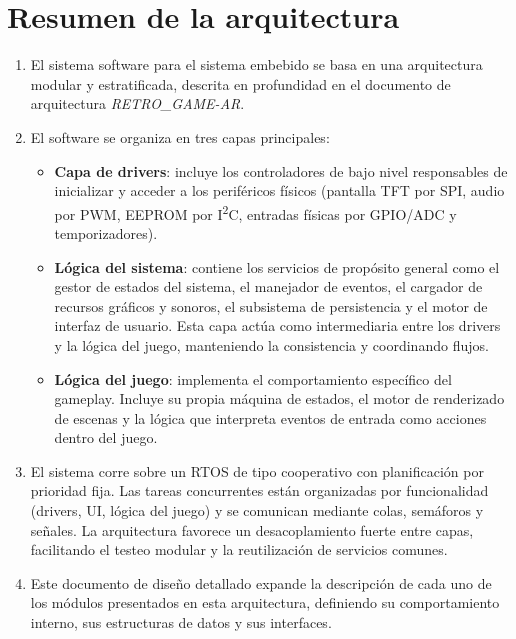 \documentclass[11pt,a4paper]{article}
\begin{document}
\section{Resumen de la arquitectura}
\begin{enumerate}
  \item El sistema software para el sistema embebido \textit{\ttitle} se basa en una arquitectura modular y estratificada, descrita en profundidad en el documento de arquitectura \textit{RETRO\_GAME-AR}. 

  \item El software se organiza en tres capas principales:

  \begin{itemize}
    \item \textbf{Capa de drivers}: incluye los controladores de bajo nivel responsables de inicializar y acceder a los periféricos físicos (pantalla TFT por SPI, audio por PWM, EEPROM por I\textsuperscript{2}C, entradas físicas por GPIO/ADC y temporizadores). 

    \item \textbf{Lógica del sistema}: contiene los servicios de propósito general como el gestor de estados del sistema, el manejador de eventos, el cargador de recursos gráficos y sonoros, el subsistema de persistencia y el motor de interfaz de usuario. Esta capa actúa como intermediaria entre los drivers y la lógica del juego, manteniendo la consistencia y coordinando flujos.

    \item \textbf{Lógica del juego}: implementa el comportamiento específico del gameplay. Incluye su propia máquina de estados, el motor de renderizado de escenas y la lógica que interpreta eventos de entrada como acciones dentro del juego.

  \end{itemize}

  \item El sistema corre sobre un RTOS de tipo cooperativo con planificación por prioridad fija. Las tareas concurrentes están organizadas por funcionalidad (drivers, UI, lógica del juego) y se comunican mediante colas, semáforos y señales. La arquitectura favorece un desacoplamiento fuerte entre capas, facilitando el testeo modular y la reutilización de servicios comunes.

  \item Este documento de diseño detallado expande la descripción de cada uno de los módulos presentados en esta arquitectura, definiendo su comportamiento interno, sus estructuras de datos y sus interfaces.

\end{enumerate}
\end{document}
